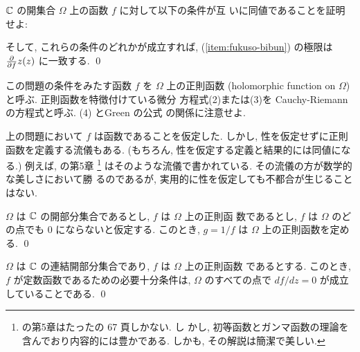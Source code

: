 \documentclass[12pt,twoside]{jarticle}
\begin{document}
\begin{question}\label{q:seisoku-kansu}
  ${\mathbb C}$ の開集合 $\Omega$ 上の函数 $f$ に対して以下の条件が互
  いに同値であることを証明せよ:
  そして, これらの条件のどれかが成立すれば, (\ref{item:fukuso-bibun})
  の極限は $\frac{\partial}{\partial f}{z}(z)$ に一致する. 
  \qed
\end{question}

\noindent この問題の条件をみたす函数 $f$ を $\Omega$ 上の正則函数
(holomorphic function on $\Omega$)と呼ぶ. 正則函数を特徴付けている微分
方程式(2)または(3)を Cauchy-Riemann の方程式と呼ぶ. (4) とGreen の公式
の関係に注意せよ.


上の問題において $f$ は函数であることを仮定した. しかし,
性を仮定せずに正則函数を定義する流儀もある. (もちろん,
性を仮定する定義と結果的には同値になる.) 例えば,
\cite{takagi} の第5章%
\footnote{\cite{takagi} の第5章はたったの 67 頁しかない. し
  かし, 初等函数とガンマ函数の理論を含んでおり内容的には豊かである. 
  しかも, その解説は簡潔で美しい.}
%
はそのような流儀で書かれている. その流儀の方が数学的な美しさにおいて勝
るのであるが, 実用的に性を仮定しても不都合が生じることはない.

\begin{question}
  $\Omega$ は ${\mathbb C}$ の開部分集合であるとし, $f$ は $\Omega$ 上の正則函
  数であるとし, $f$ は $\Omega$ のどの点でも $0$ にならないと仮定する.
  このとき, $g=1/f$ は $\Omega$ 上の正則函数を定める. \qed
\end{question}

\begin{question}
  $\Omega$ は ${\mathbb C}$ の連結開部分集合であり, $f$ は $\Omega$ 上の正則函数
  であるとする. このとき, $f$ が定数函数であるための必要十分条件は,
  $\Omega$ のすべての点で $df/dz=0$ が成立していることである. \qed
\end{question}
\end{document}

